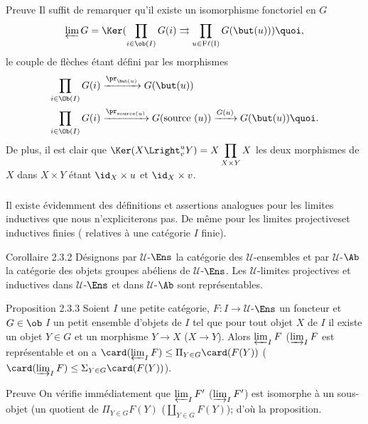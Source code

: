 \begin{enonce*}[remark]{Preuve}
Il suffit de remarquer qu'il existe un isomorphisme fonctoriel en
$G$
$$
\varprojlim G=\Ker (\prod_{i\in \ob(I)} %
G(i)\rightrightarrows \prod_{u\in \rm{F\ell}(I)} G(\but(u))){\quoi},
$$
le couple de flèches étant défini par les morphismes
\begin{align*}
\prod_{i\in \Ob(I)}  G(i) %
 & \xrightarrow{\pr_{\but(u)}}{} G(\but(u))\\
\prod_{i\in \Ob(I)} G(i) %
 &\xrightarrow{\pr_{\text{source}(u)}}{} G(\text{source
}(u))\xrightarrow{G(u)} G(\but(u)){\quoi}.
\end{align*}
De plus, il est clair que $\Ker (X  \displaystyle \Lright^{u}_{v}Y)=
X\prod_{X\times Y} X$ les deux morphismes de $X$ dans $X\times Y$
étant $\id_X \times u$ et $\id_X\times v$.
\end{enonce*}

\setcounter{subsection}{3} \setcounter{subsubsection}{0}
\subsubsection{}
Il existe évidemment des définitions et assertions analogues pour
les limites inductives que nous n'expliciterons pas. De même pour
les limites projectives\pageoriginale et inductives finies (\ie
relatives à une %
catégorie $I$ finie).


\begin{enonce*}{Corollaire 2.3.2}
Désignons par $𝒰$-$\Ens$ la catégorie des
$𝒰$-ensembles et par $𝒰$-$\Ab$ la catégorie des
objets groupes abéliens de $𝒰$-$\Ens$. Les
$𝒰$-limites projectives et inductives dans
$𝒰$-$\Ens$ et dans $𝒰$-$\Ab$ sont représentables.
\end{enonce*}

\begin{enonce*}{Proposition 2.3.3}
Soient $I$ une petite catégorie, $F:I\rightarrow 𝒰$-$\Ens$
un foncteur et \linebreak %
$G\in\ob$ $I$ un petit ensemble d'objets de $I$ tel que pour tout
objet $X$ de $I$ il existe un objet $Y\in G$ et un morphisme
$Y\rightarrow X$ (\resp  $X\rightarrow Y$). Alors $\varprojlim_I F$
(\resp  $\varinjlim_I F$ est représentable et on a
$\card(\varprojlim_I F)\leq \Pi_{Y\in G}\card(F(Y))$ (\resp
$\card(\varinjlim_I F)\leq \Sigma_{Y\in G}\card(F(Y))$).
\end{enonce*}

\begin{enonce*}[remark]{Preuve}
On vérifie immédiatement que $\varprojlim_I F'$ (\resp $\varinjlim_I
F'$) est isomorphe à un sous-objet (\resp  un quotient de $\Pi_{Y\in
G}F(Y)$ (\resp  $\amalg_{Y\in G}F(Y)$); d'où la proposition.
\end{enonce*}

